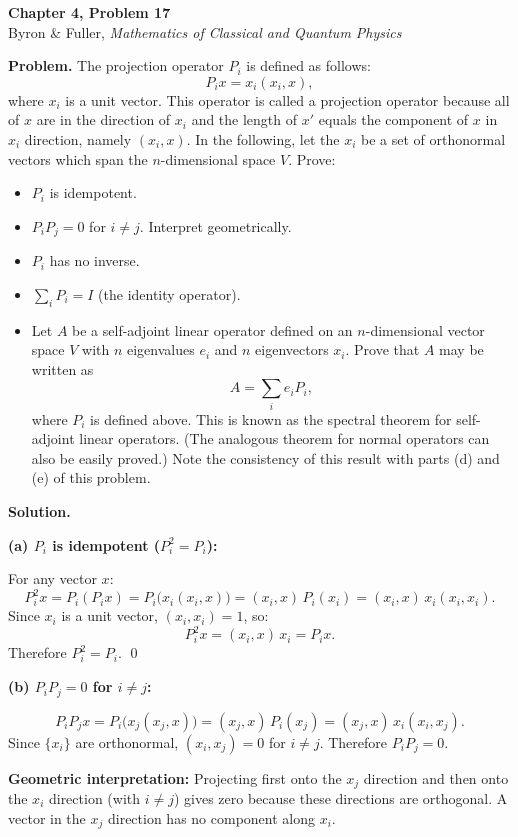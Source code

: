 \documentclass[12pt]{article}
\begin{document}
\begin{center}
{\Large\bfseries Chapter 4, Problem 17}\\[6pt]
Byron \& Fuller, \textit{Mathematics of Classical and Quantum Physics}
\end{center}

\bigskip

\textbf{Problem.} The projection operator $P_i$ is defined as follows:
\[
P_i x = x_i(x_i, x),
\]
where $x_i$ is a unit vector. This operator is called a projection operator because all of $x$ are in the direction of $x_i$ and the length of $x'$ equals the component of $x$ in $x_i$ direction, namely $(x_i, x)$. In the following, let the $x_i$ be a set of orthonormal vectors which span the $n$-dimensional space $V$. Prove:
\begin{itemize}
\item[(a)] $P_i$ is idempotent.
\item[(b)] $P_i P_j = 0$ for $i \neq j$. Interpret geometrically.
\item[(c)] $P_i$ has no inverse.
\item[(d)] $\sum_i P_i = I$ (the identity operator).
\item[(e)] Let $A$ be a self-adjoint linear operator defined on an $n$-dimensional vector space $V$ with $n$ eigenvalues $e_i$ and $n$ eigenvectors $x_i$. Prove that $A$ may be written as
\[
A = \sum_i e_i P_i,
\]
where $P_i$ is defined above. This is known as the spectral theorem for self-adjoint linear operators. (The analogous theorem for normal operators can also be easily proved.) Note the consistency of this result with parts (d) and (e) of this problem.
\end{itemize}

\bigskip
\textbf{Solution.}

\textbf{(a) $P_i$ is idempotent ($P_i^2 = P_i$):}

For any vector $x$:
\[
P_i^2 x = P_i(P_i x) = P_i\bigl(x_i(x_i, x)\bigr) = (x_i, x)\,P_i(x_i) = (x_i, x)\,x_i(x_i, x_i).
\]
Since $x_i$ is a unit vector, $(x_i, x_i) = 1$, so:
\[
P_i^2 x = (x_i, x)\,x_i = P_i x.
\]
Therefore $P_i^2 = P_i$. \qed

\bigskip
\textbf{(b) $P_i P_j = 0$ for $i \neq j$:}

\[
P_i P_j x = P_i\bigl(x_j(x_j, x)\bigr) = (x_j, x)\,P_i(x_j) = (x_j, x)\,x_i(x_i, x_j).
\]
Since $\{x_i\}$ are orthonormal, $(x_i, x_j) = 0$ for $i \neq j$. Therefore $P_i P_j = 0$.

\textbf{Geometric interpretation:} Projecting first onto the $x_j$ direction and then onto the $x_i$ direction (with $i \neq j$) gives zero because these directions are orthogonal. A vector in the $x_j$ direction has no component along $x_i$.
\end{document}
